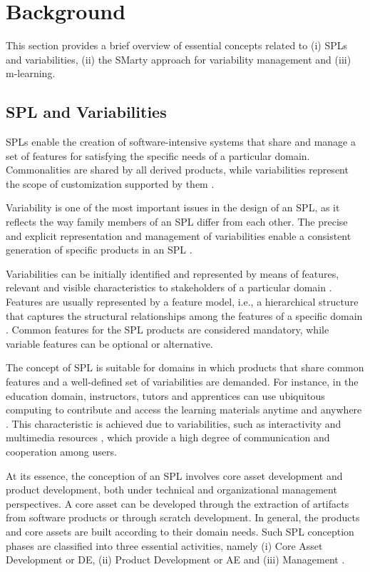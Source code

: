\section{Background}\label{section2}

This section provides a brief overview of essential concepts related to (i) SPLs and variabilities, (ii) the SMarty approach for variability management and (iii) m-learning.

\subsection{SPL and Variabilities}

SPLs enable the creation of software-intensive systems that share and manage a set of features for satisfying the specific needs of a particular domain. Commonalities are shared by all derived products, while variabilities represent the scope of customization supported by them \cite{bockle05,vanderlinden07}.

Variability is one of the most important issues in the design of an SPL, as it reflects the way family members of an SPL differ from each other. The precise and explicit representation and management of variabilities enable a consistent generation of specific products in an SPL \cite{chen11,capilla13}. 

Variabilities can be initially identified and represented by means of features, relevant and visible characteristics to stakeholders of a particular domain \cite{bosch01}. Features are usually represented by a feature model, i.e., a hierarchical structure that captures the structural relationships among the features of a specific domain \cite{bockle05,vanderlinden07}. Common features for the SPL products are considered mandatory, while variable features can be optional or alternative.


The concept of SPL is suitable for domains in which products that share common features and a well-defined set of variabilities are demanded. For instance, in the education domain, instructors, tutors and apprentices can use ubiquitous computing to contribute and access the learning materials anytime and anywhere \cite{kukulska05}. This characteristic is achieved due to variabilities, such as interactivity and multimedia resources \cite{falvojr14a,falvojr14b}, which provide a high degree of communication and cooperation among users.

At its essence, the conception of an SPL involves core asset development and product development, both under technical and organizational management perspectives. A core asset can be developed through the extraction of artifacts from software products or through scratch development. In general, the products and core assets are built according to their domain needs. Such SPL conception phases are classified into three essential activities, namely (i) Core Asset Development or DE, (ii) Product Development or AE and (iii) Management \cite{bockle05,vanderlinden07}.

